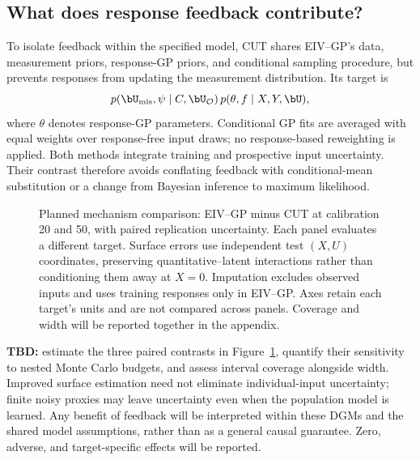 \subsection{What does response feedback contribute?}
To isolate feedback within the specified model, CUT shares EIV--GP's data, measurement priors, response-GP priors, and conditional sampling procedure, but prevents responses from updating the measurement distribution. Its target is
\[
 p(\bU_{\rm mis},\psi\mid C,\bU_{\mathcal O})\,
 p(\theta,f\mid X,Y,\bU),
\]
where $\theta$ denotes response-GP parameters. Conditional GP fits are averaged with equal weights over response-free input draws; no response-based reweighting is applied. Both methods integrate training and prospective input uncertainty. Their contrast therefore avoids conflating feedback with conditional-mean substitution or a change from Bayesian inference to maximum likelihood.

\begin{figure}[!htbp]
\centering\small
{}\hfill
{}\hfill
{}
\caption{Planned mechanism comparison: EIV--GP minus CUT at calibration 20 and 50, with paired replication uncertainty. Each panel evaluates a different target. Surface errors use independent test $(X,U)$ coordinates, preserving quantitative--latent interactions rather than conditioning them away at $X=0$. Imputation excludes observed inputs and uses training responses only in EIV--GP. Axes retain each target's units and are not compared across panels. Coverage and width will be reported together in the appendix.}
\label{fig:numerical-feedback}
\end{figure}

\textbf{TBD:} estimate the three paired contrasts in Figure~\ref{fig:numerical-feedback}, quantify their sensitivity to nested Monte Carlo budgets, and assess interval coverage alongside width. Improved surface estimation need not eliminate individual-input uncertainty; finite noisy proxies may leave uncertainty even when the population model is learned. Any benefit of feedback will be interpreted within these DGMs and the shared model assumptions, rather than as a general causal guarantee. Zero, adverse, and target-specific effects will be reported.

